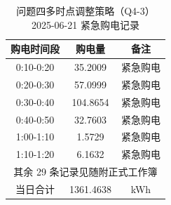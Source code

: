 \begin{table}[htbp]
\centering
\caption{问题四多时点调整策略（Q4-3）2025-06-21 紧急购电记录}\label{tab:q4-3-emergency}
\normalsize\setlength{\tabcolsep}{6pt}
\begin{tabular}{@{}ccc@{}}
\toprule
购电时间段 & 购电量 & 备注 \\
\midrule
0:10-0:20 & 35.2009 & 紧急购电 \\
0:20-0:30 & 57.0999 & 紧急购电 \\
0:30-0:40 & 104.8654 & 紧急购电 \\
0:40-0:50 & 32.7603 & 紧急购电 \\
1:00-1:10 & 1.5729 & 紧急购电 \\
1:10-1:20 & 6.1632 & 紧急购电 \\
\multicolumn{3}{c}{其余 29 条记录见随附正式工作簿} \\
\midrule
当日合计 & 1361.4638 & kWh \\
\bottomrule
\end{tabular}
\end{table}
